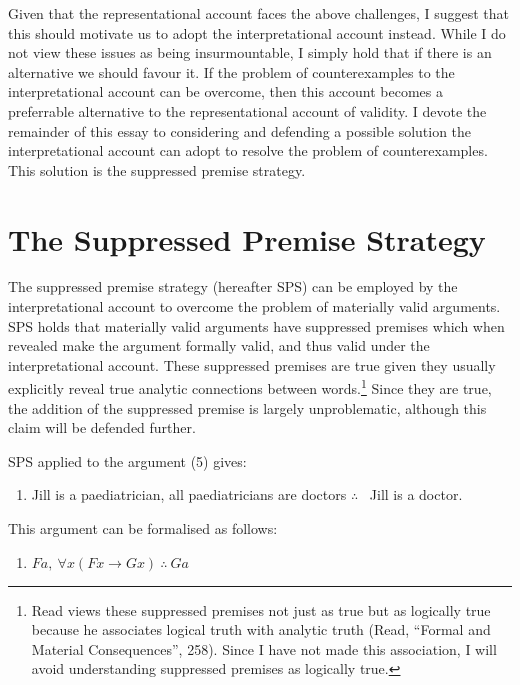 Given that the representational account faces the above challenges, I
suggest that this should motivate us to adopt the interpretational
account instead. While I do not view these issues as being
insurmountable, I simply hold that if there is an alternative we should
favour it. If the problem of counterexamples to the interpretational
account can be overcome, then this account becomes a preferrable
alternative to the representational account of validity. I devote the
remainder of this essay to considering and defending a possible solution
the interpretational account can adopt to resolve the problem of
counterexamples. This solution is the suppressed premise strategy.

\section*{The Suppressed Premise Strategy}

The suppressed premise strategy (hereafter SPS) can be employed by the
interpretational account to overcome the problem of materially valid
arguments. SPS holds that materially valid arguments have suppressed
premises which when revealed make the argument formally valid, and thus
valid under the interpretational account. These suppressed premises are
true given they usually explicitly reveal true analytic connections
between words.\footnote{Read views these suppressed premises not just as
  true but as logically true because he associates logical truth with
  analytic truth (Read, ``Formal and Material Consequences'', 258).
  Since I have not made this association, I will avoid understanding
  suppressed premises as logically true.} Since they are true, the
addition of the suppressed premise is largely unproblematic, although
this claim will be defended further.

SPS applied to the argument (5) gives:

\begin{enumerate}[leftmargin=42pt] 
\def\labelenumi{(\arabic{enumi})}
\setcounter{enumi}{10}
\item
  Jill is a paediatrician, all paediatricians are doctors $\therefore$ \ Jill is a doctor.
\end{enumerate}

\noindent This argument can be formalised as follows:

\begin{enumerate}[leftmargin=42pt] 
\def\labelenumi{(\arabic{enumi})}
\setcounter{enumi}{11}
\item
  $Fa, \ \forall x(Fx \rightarrow Gx) \ \therefore \ Ga$
\end{enumerate}


